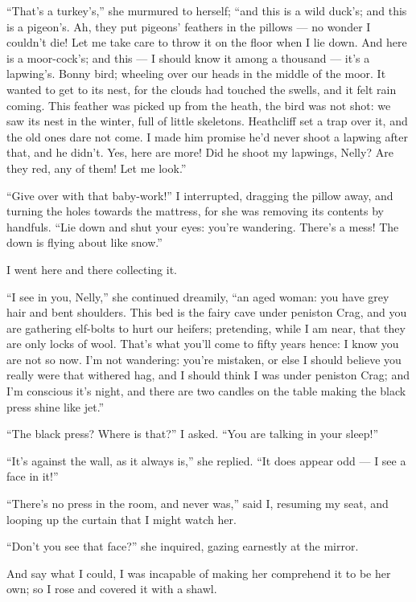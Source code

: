 \par “That's a turkey's,” she murmured to herself; “and this is a wild duck's; and this is a pigeon's. Ah, they put pigeons' feathers in the pillows — no wonder I couldn't die! Let me take care to throw it on the floor when I lie down. And here is a moor-cock's; and this — I should know it among a thousand — it's a lapwing's. Bonny bird; wheeling over our heads in the middle of the moor. It wanted to get to its nest, for the clouds had touched the swells, and it felt rain coming. This feather was picked up from the heath, the bird was not shot: we saw its nest in the winter, full of little skeletons. Heathcliff set a trap over it, and the old ones dare not come. I made him promise he'd never shoot a lapwing after that, and he didn't. Yes, here are more! Did he shoot my lapwings, Nelly? Are they red, any of them! Let me look.”
\par “Give over with that baby-work!” I interrupted, dragging the pillow away, and turning the holes towards the mattress, for she was removing its contents by handfuls. “Lie down and shut your eyes: you're wandering. There's a mess! The down is flying about like snow.”
\par I went here and there collecting it.
\par “I see in you, Nelly,” she continued dreamily, “an aged woman: you have grey hair and bent shoulders. This bed is the fairy cave under peniston Crag, and you are gathering elf-bolts to hurt our heifers; pretending, while I am near, that they are only locks of wool. That's what you'll come to fifty years hence: I know you are not so now. I'm not wandering: you're mistaken, or else I should believe you really were that withered hag, and I should think I was under peniston Crag; and I'm conscious it's night, and there are two candles on the table making the black press shine like jet.”
\par “The black press? Where is that?” I asked. “You are talking in your sleep!”
\par “It's against the wall, as it always is,” she replied. “It does appear odd — I see a face in it!”
\par “There's no press in the room, and never was,” said I, resuming my seat, and looping up the curtain that I might watch her.
\par “Don't you see that face?” she inquired, gazing earnestly at the mirror.
\par And say what I could, I was incapable of making her comprehend it to be her own; so I rose and covered it with a shawl.

